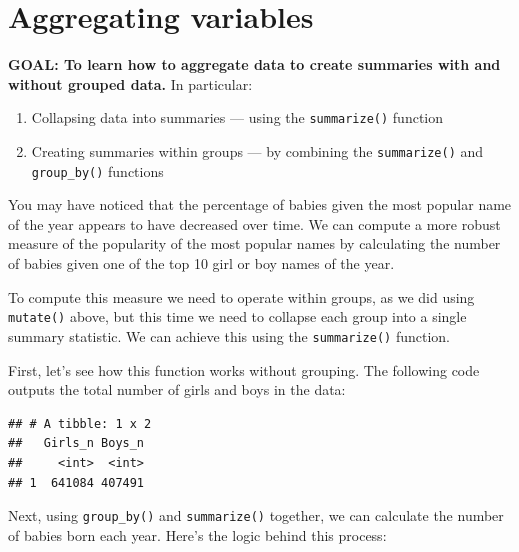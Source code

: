 \documentclass[
]{book}
\newenvironment{Shaded}{\begin{snugshade}}{\end{snugshade}}
\newcommand{\DataTypeTok}[1]{\textcolor[rgb]{0.13,0.29,0.53}{#1}}
\newcommand{\KeywordTok}[1]{\textcolor[rgb]{0.13,0.29,0.53}{\textbf{#1}}}
\newcommand{\NormalTok}[1]{#1}
\newcommand{\OperatorTok}[1]{\textcolor[rgb]{0.81,0.36,0.00}{\textbf{#1}}}
\newcommand{\StringTok}[1]{\textcolor[rgb]{0.31,0.60,0.02}{#1}}
\providecommand{\tightlist}{%
  \setlength{\itemsep}{0pt}\setlength{\parskip}{0pt}}
\begin{document}
\hypertarget{aggregating-variables}{%
\section{Aggregating variables}\label{aggregating-variables}}

\textbf{GOAL: To learn how to aggregate data to create summaries with and without grouped data.} In particular:

\begin{enumerate}
\def\labelenumi{\arabic{enumi}.}
\tightlist
\item
  Collapsing data into summaries --- using the \texttt{summarize()} function
\item
  Creating summaries within groups --- by combining the \texttt{summarize()} and \texttt{group\_by()} functions
\end{enumerate}

You may have noticed that the percentage of babies given the most
popular name of the year appears to have decreased over time. We can
compute a more robust measure of the popularity of the most popular
names by calculating the number of babies given one of the top 10 girl
or boy names of the year.

To compute this measure we need to operate within groups, as
we did using \texttt{mutate()} above, but this time we need to collapse each
group into a single summary statistic. We can achieve this using the
\texttt{summarize()} function.

First, let's see how this function works without grouping. The following
code outputs the total number of girls and boys in the data:

\begin{Shaded}
\end{Shaded}

\begin{verbatim}
## # A tibble: 1 x 2
##   Girls_n Boys_n
##     <int>  <int>
## 1  641084 407491
\end{verbatim}

Next, using \texttt{group\_by()} and \texttt{summarize()} together, we can calculate the
number of babies born each year. Here's the logic behind this process:
\end{document}
